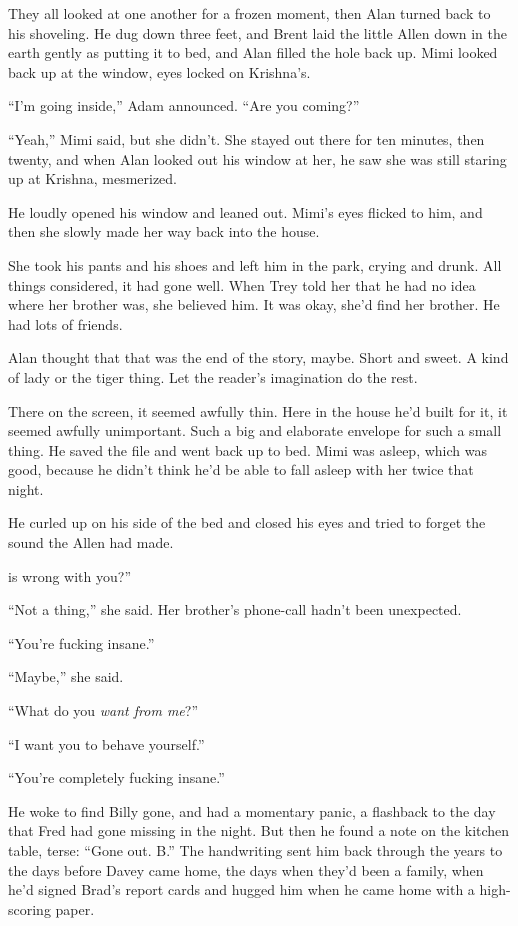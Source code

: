 They all looked at one another for a frozen moment, then Alan turned
back to his shoveling.  He dug down three feet, and Brent laid the
little Allen down in the earth gently as putting it to bed, and Alan
filled the hole back up.  Mimi looked back up at the window, eyes
locked on Krishna's.

``I'm going inside,'' Adam announced.  ``Are you coming?''

``Yeah,'' Mimi said, but she didn't.  She stayed out there for ten
minutes, then twenty, and when Alan looked out his window at her, he
saw she was still staring up at Krishna, mesmerized.

He loudly opened his window and leaned out.  Mimi's eyes flicked to
him, and then she slowly made her way back into the house.

She took his pants and his shoes and left him in the park, crying and
drunk.  All things considered, it had gone well.  When Trey told her
that he had no idea where her brother was, she believed him.  It was
okay, she'd find her brother.  He had lots of friends.

Alan thought that that was the end of the story, maybe.  Short and
sweet.  A kind of lady or the tiger thing.  Let the reader's
imagination do the rest.

There on the screen, it seemed awfully thin.  Here in the house he'd
built for it, it seemed awfully unimportant.  Such a big and elaborate
envelope for such a small thing.  He saved the file and went back up
to bed.  Mimi was asleep, which was good, because he didn't think he'd
be able to fall asleep with her twice that night.

He curled up on his side of the bed and closed his eyes and tried to
forget the sound the Allen had made.

is wrong with you?''

``Not a thing,'' she said.  Her brother's phone-call hadn't been
unexpected. 

``You're fucking insane.''

``Maybe,'' she said. 

``What do you \textit{want from me}?''

``I want you to behave yourself.''

``You're completely fucking insane.''

He woke to find Billy gone, and had a momentary panic, a flashback to
the day that Fred had gone missing in the night.  But then he found a
note on the kitchen table, terse:  ``Gone out.  B.'' The handwriting
sent him back through the years to the days before Davey came home,
the days when they'd been a family, when he'd signed Brad's report
cards and hugged him when he came home with a high-scoring paper.

